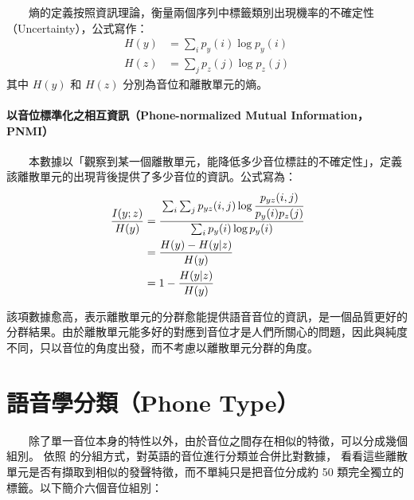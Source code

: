 　　熵的定義按照資訊理論，衡量兩個序列中標籤類別出現機率的不確定性（Uncertainty），公式寫作：
    \begin{align}
        H(y) &= \sum_i{p_y(i)\log p_y(i)} \\
        H(z) &= \sum_j{p_z(j)\log p_z(j)}
    \end{align}
其中 $H(y)$ 和 $H(z)$ 分別為音位和離散單元的熵。

\paragraph{以音位標準化之相互資訊（Phone-normalized Mutual Information，PNMI）}

　　本數據以「觀察到某一個離散單元，能降低多少音位標註的不確定性」，定義該離散單元的出現背後提供了多少音位的資訊。公式寫為：
    \begin{align}
        \frac{I(y;z)}{H(y)}&=\cfrac{\sum_i \sum_j p_{yz}(i, j) \log \cfrac{p_{yz}(i, j)}{p_y(i)p_z(j)}}{\sum_i p_y(i) \log p_y(i)} \\
        &=\frac{H(y)-H(y|z)}{H(y)} \\
        &=1-\frac{H(y|z)}{H(y)}
    \end{align}

        該項數據愈高，表示離散單元的分群愈能提供語音音位的資訊，是一個品質更好的分群結果。由於離散單元能多好的對應到音位才是人們所關心的問題，因此與純度不同，只以音位的角度出發，而不考慮以離散單元分群的角度。

% 

\section{語音學分類（Phone Type）}


　　除了單一音位本身的特性以外，由於音位之間存在相似的特徵，可以分成幾個組別。
依照 \cite{10097097, abdullah23_interspeech} 的分組方式，對英語的音位進行分類並合併比對數據，
看看這些離散單元是否有擷取到相似的發聲特徵，而不單純只是把音位分成約 50 類完全獨立的標籤。以下簡介六個音位組別：




